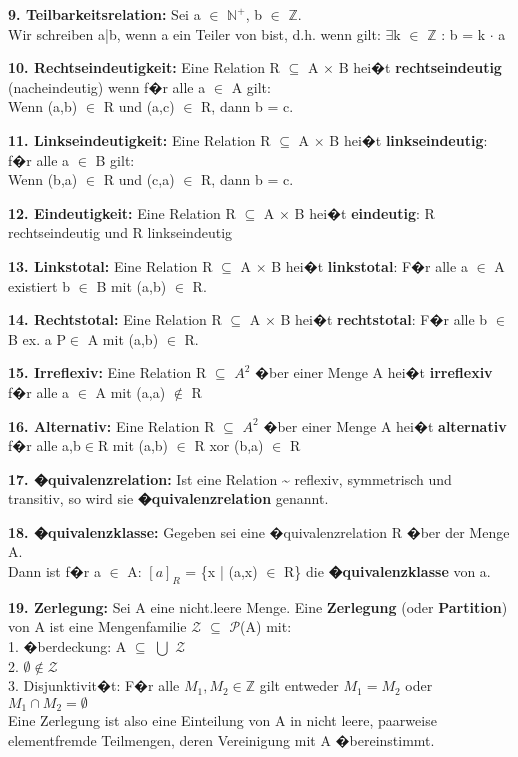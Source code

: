 \textbf{9. Teilbarkeitsrelation:} Sei a $\in$ $\mathbb{N}^+$, b $\in$ $\mathbb{Z}$.\\
Wir schreiben a|b, wenn \glqq a ein Teiler von b\grqq ist, d.h. wenn gilt:
$\exists$k $\in$ $\mathbb{Z}$ : b = k $\cdot$ a

\textbf{10. Rechtseindeutigkeit:} Eine Relation R $\subseteq$ A $\times$ B hei�t \textbf{rechtseindeutig} (nacheindeutig) wenn f�r alle a $\in$ A gilt: \\
Wenn (a,b) $\in$ R und (a,c) $\in$ R, dann b = c.

\textbf{11. Linkseindeutigkeit:} Eine Relation R $\subseteq$ A $\times$ B hei�t \textbf{linkseindeutig}: f�r alle a $\in$ B gilt: \\
Wenn (b,a) $\in$ R und (c,a) $\in$ R, dann b = c.

\textbf{12. Eindeutigkeit:} Eine Relation R $\subseteq$ A $\times$ B hei�t \textbf{eindeutig}: R rechtseindeutig und R linkseindeutig

\textbf{13. Linkstotal:} Eine Relation R $\subseteq$ A $\times$ B hei�t \textbf{linkstotal}: F�r alle a $\in$ A existiert b $\in$ B mit (a,b) $\in$ R.

\textbf{14. Rechtstotal:} Eine Relation R $\subseteq$ A $\times$ B hei�t \textbf{rechtstotal}: F�r alle b $\in$ B ex. a P$\in$ A mit (a,b) $\in$ R.

\textbf{15. Irreflexiv:} Eine Relation R $\subseteq$ $A^2$ �ber einer Menge A hei�t \textbf{irreflexiv} f�r alle a $\in$ A mit (a,a) $\notin$ R

\textbf{16. Alternativ:} Eine Relation R $\subseteq$ $A^2$ �ber einer Menge A hei�t \textbf{alternativ} f�r alle a,b$\in$R mit (a,b) $\in$ R xor (b,a) $\in$ R

\textbf{17. �quivalenzrelation:} Ist eine Relation \textasciitilde{} reflexiv, symmetrisch und transitiv, so wird sie \textbf{�quivalenzrelation} genannt.

\textbf{18. �quivalenzklasse:} Gegeben sei eine �quivalenzrelation R �ber der Menge A.\\
Dann ist f�r a $\in$ A: $[a]_R$ = \{x | (a,x) $\in$ R\} die \textbf{�quivalenzklasse} von a.  

\textbf{19. Zerlegung:} Sei A eine nicht.leere Menge. Eine \textbf{Zerlegung} (oder \textbf{Partition}) von A ist eine Mengenfamilie $\mathcal{Z}$ $\subseteq$ $\mathcal{P}$(A) mit:\\
1. �berdeckung: A $\subseteq$ $\bigcup$ $\mathcal{Z}$\\
2. $\emptyset \notin \mathcal{Z}$\\
3. Disjunktivit�t: F�r alle $M_1, M_2 \in \mathbb{Z}$ gilt entweder $M_1 = M_2$ oder $M_1 \cap M_2 = \emptyset$\\
Eine Zerlegung ist also eine Einteilung von A in nicht leere, paarweise elementfremde Teilmengen, deren Vereinigung mit A �bereinstimmt.

